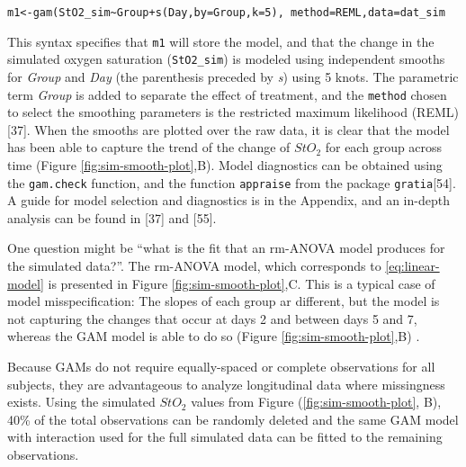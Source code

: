 \documentclass[
]{article}
\begin{document}
\texttt{m1\textless{}-gam(StO2\_sim\textasciitilde{}Group+s(Day,by=Group,k=5),\ method=\textquotesingle{}REML\textquotesingle{},data=dat\_sim}

This syntax specifies that \texttt{m1} will store the model, and that the change in the simulated oxygen saturation (\texttt{StO2\_sim}) is modeled using independent smooths for \emph{Group} and \emph{Day} (the parenthesis preceded by \emph{s}) using 5 knots. The parametric term \emph{Group} is added to separate the effect of treatment, and the \texttt{method} chosen to select the smoothing parameters is the restricted maximum likelihood (REML) {[}37{]}. When the smooths are plotted over the raw data, it is clear that the model has been able to capture the trend of the change of \(StO_2\) for each group across time (Figure \ref{fig:sim-smooth-plot},B). Model diagnostics can be obtained using the \texttt{gam.check} function, and the function \texttt{appraise} from the package \texttt{gratia}{[}54{]}. A guide for model selection and diagnostics is in the Appendix, and an in-depth analysis can be found in {[}37{]} and {[}55{]}.

One question might be ``what is the fit that an rm-ANOVA model produces for the simulated data?''. The rm-ANOVA model, which corresponds to \eqref{eq:linear-model} is presented in Figure \ref{fig:sim-smooth-plot},C. This is a typical case of model misspecification: The slopes of each group ar different, but the model is not capturing the changes that occur at days 2 and between days 5 and 7, whereas the GAM model is able to do so (Figure \ref{fig:sim-smooth-plot},B) .

Because GAMs do not require equally-spaced or complete observations for all subjects, they are advantageous to analyze longitudinal data where missingness exists. Using the simulated \(StO_2\) values from Figure (\ref{fig:sim-smooth-plot}, B), 40\% of the total observations can be randomly deleted and the same GAM model with interaction used for the full simulated data can be fitted to the remaining observations.
\end{document}

